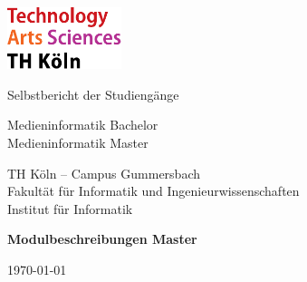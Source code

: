 
\begin{titlepage}

	\includegraphics[width=0.25\textwidth]{../../../assets/logo_th_koeln.pdf}

	\vspace{2cm}
	{\Large\raggedright Selbstbericht der Studiengänge\par}
	\vspace{-1cm}
	{\Huge\singlespacing Medieninformatik Bachelor \\ Medieninformatik Master \par}
	\vspace{1cm}
	{\Large TH Köln – Campus Gummersbach \\ Fakultät für Informatik und Ingenieurwissenschaften \\ Institut für Informatik\par}
	\vspace{1.5cm}
	{\huge\bfseries Modulbeschreibungen Master\par}

	\vfill

	{\large \today\par}
\end{titlepage}
